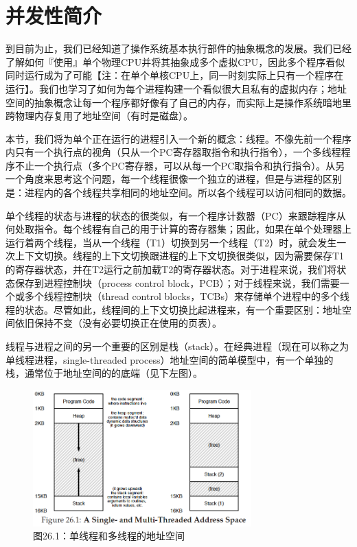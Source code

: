 \chapter{并发性简介}
\thispagestyle{empty}

到目前为止，我们已经知道了操作系统基本执行部件的抽象概念的发展。我们已经了解如何『使用』单个物理CPU并将其抽象成多个虚拟CPU，因此多个程序看似同时运行成为了可能【注：在单个单核CPU上，同一时刻实际上只有一个程序在运行】。我们也学习了如何为每个进程构建一个看似很大且私有的虚拟内存；地址空间的抽象概念让每一个程序都好像有了自己的内存，而实际上是操作系统暗地里跨物理内存复用了地址空间（有时是磁盘）。

本节，我们将为单个正在运行的进程引入一个新的概念：线程。不像先前一个程序内只有一个执行点的视角（只从一个PC寄存器取指令和执行指令），一个多线程程序不止一个执行点（多个PC寄存器，可以从每一个PC取指令和执行指令）。从另一个角度来思考这个问题，每一个线程很像一个独立的进程，但是与进程的区别是：进程内的各个线程共享相同的地址空间。所以各个线程可以访问相同的数据。

单个线程的状态与进程的状态的很类似，有一个程序计数器（PC）来跟踪程序从何处取指令。每个线程有自己的用于计算的寄存器集；因此，如果在单个处理器上运行着两个线程，当从一个线程（T1）切换到另一个线程（T2）时，就会发生一次上下文切换。线程的上下文切换跟进程的上下文切换很类似，因为需要保存T1的寄存器状态，并在T2运行之前加载T2的寄存器状态。对于进程来说，我们将状态保存到进程控制块（process control block，PCB）；对于线程来说，我们需要一个或多个线程控制块（thread control blocks，TCBs）来存储单个进程中的多个线程的状态。尽管如此，线程间的上下文切换比起进程来，有一个重要区别：地址空间依旧保持不变（没有必要切换正在使用的页表）。

线程与进程之间的另一个重要的区别是栈（stack）。在经典进程（现在可以称之为单线程进程，single-threaded process）地址空间的简单模型中，有一个单独的栈，通常位于地址空间的的底端（见下左图）。

\begin{figure}[h]
\centering
\includegraphics[width=0.75\textwidth]{fig/figure-26-1.png}
\caption{图26.1：单线程和多线程的地址空间} \label{fig:figure-26-1}
\end{figure}


